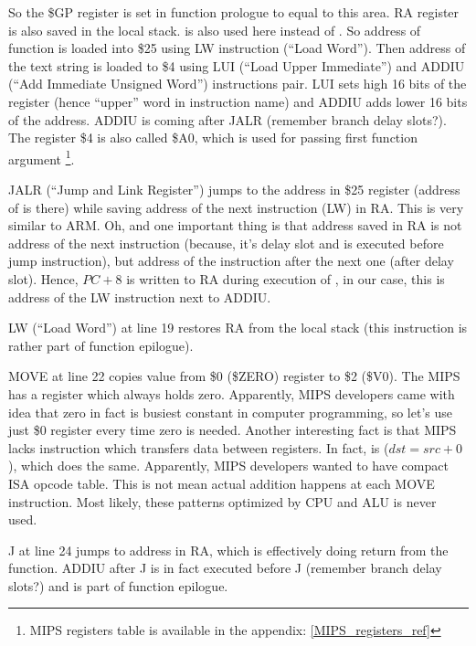 So the \$GP register is set in function prologue to equal to this area.
\ac{RA} register is also saved in the local stack.
\puts is also used here instead of \printf.
So address of \puts function is loaded into \$25 using LW instruction (``Load Word'').
Then address of the text string is loaded to \$4 using LUI (``Load Upper Immediate'') and 
ADDIU (``Add Immediate Unsigned Word'') instructions pair.
LUI sets high 16 bits of the register (hence ``upper'' word in instruction name) and ADDIU adds
lower 16 bits of the address.
ADDIU is coming after JALR (remember branch delay slots?).
The register \$4 is also called \$A0, which is used for passing first function argument
\footnote{MIPS registers table is available in the appendix: \ref{MIPS_registers_ref}}.

JALR (``Jump and Link Register'') jumps to the address in \$25 register (address of \puts is there) while saving
address of the next instruction (LW) in \ac{RA}.
This is very similar to ARM.
Oh, and one important thing is that address saved in \ac{RA} is not address of the next instruction (because,
it's delay slot and is executed before jump instruction),
but address of the instruction after the next one (after delay slot).
Hence, $PC + 8$ is written to \ac{RA} during execution of , in our case, this is address of the LW
instruction next to ADDIU.

LW (``Load Word'') at line 19 restores \ac{RA} from the local stack 
(this instruction is rather part of function epilogue).

MOVE at line 22 copies value from \$0 (\$ZERO) register to \$2 (\$V0). 
The MIPS has a  register which always holds zero.
Apparently, MIPS developers came with idea that zero in fact is busiest constant in computer programming,
so let's use just \$0 register every time zero is needed.
Another interesting fact is that MIPS lacks instruction which transfers data between registers.
In fact,  is  ($dst=src+0$), which does the same.
Apparently, MIPS developers wanted to have compact \ac{ISA} opcode table.
This is not mean actual addition happens at each MOVE instruction. 
Most likely, these patterns optimized by \ac{CPU} and \ac{ALU} is never used.

J at line 24 jumps to address in \ac{RA}, which is effectively doing return from the function.
ADDIU after J is in fact executed before J (remember branch delay slots?) and is part of function epilogue.

